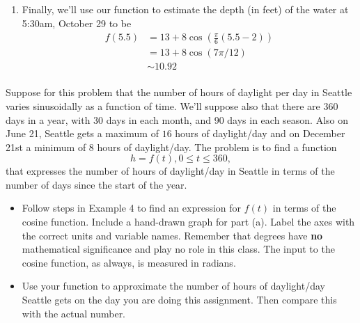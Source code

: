 \documentclass{ximera}
\begin{document}
\begin{example}
\begin{explanation}
\begin{enumerate}
\item Finally, we'll use our function to estimate the depth (in feet) of the water at 5:30am, October 29 to be
\begin{align*}
   f(5.5)   & = 13 + 8 \cos \left(  \frac{\pi}{6} \left(5.5 - 2 \right) \right) \\ 
           & = 13 + 8 \cos (7\pi / 12)  \\ 
           &  \sim  10.92 \\
         \end{align*}

\end{enumerate}
\end{explanation}
\end{example}



\begin{question}  \label{Qdsg77jhre}
Suppose for this problem that the number of hours of daylight per day in Seattle varies sinusoidally as a function of time. We'll suppose also that there are 360 days in a year, with 30 days in each month, and 90 days in each season. Also on June 21, Seattle gets a maximum of $16$ hours of daylight/day and on December 21st a minimum of $8$ hours of daylight/day. The problem is to find a function 
\[
  h = f(t) , 0\leq t \leq 360 ,
\]
that expresses the number of hours of daylight/day in Seattle in terms of the number of days since the start of the year. 

\begin{itemize}
\item{Follow steps in Example 4 to find an expression for $f(t)$ in terms of the cosine function. Include a hand-drawn graph for part (a). Label the axes with the correct units and variable names. Remember that degrees have {\bf no} mathematical significance and play no role in this class. The input to the cosine function, as always, is measured in radians.}

\item{Use your function to approximate the number of hours of daylight/day Seattle gets on the day you are doing this assignment. Then compare this with the actual number.}
\end{itemize}
\end{question}
\end{document}
